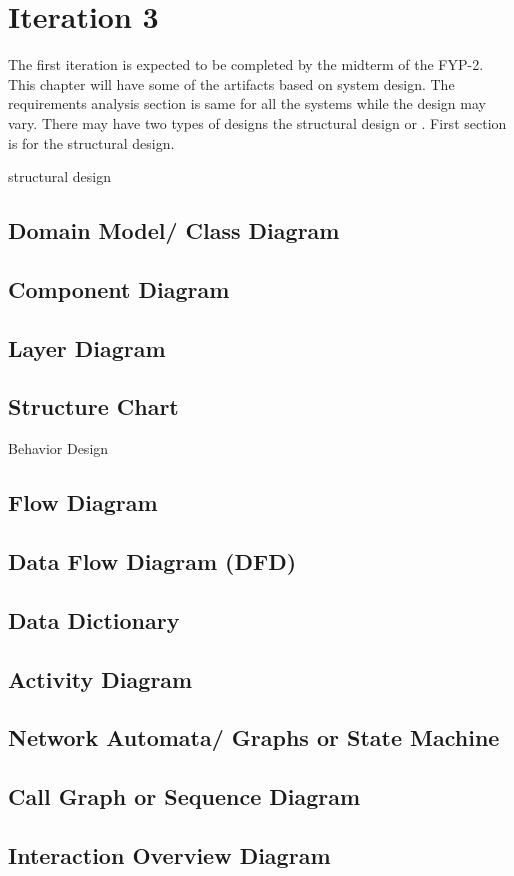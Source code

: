 \chapter{Iteration 3}
\label{ch:iter3}

The first iteration is expected to be completed by the midterm of the FYP-2.
This chapter will have some of the artifacts based on system design. The requirements analysis section is same for all the systems while the design may vary. There may have two types of designs the structural design or . First section is for the structural design.

structural design
\section{Domain Model/ Class Diagram}
\section{Component Diagram}
\section{Layer Diagram}
\section{Structure Chart}
Behavior Design
\section{Flow Diagram}
\section{Data Flow Diagram (DFD)}
\section{Data Dictionary}
\section{Activity Diagram}
\section{Network Automata/ Graphs or State Machine}
\section{Call Graph or Sequence Diagram}
\section{Interaction Overview Diagram}

